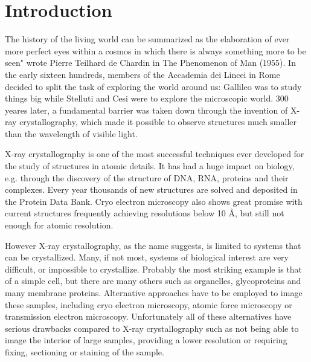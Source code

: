 \chapter{Introduction}\label{introduction}\noindent

The history of the living world can be summarized as the elaboration of ever
more perfect eyes within a cosmos in which there is always something more to be
seen" wrote Pierre Teilhard de Chardin in The Phenomenon of Man (1955). In the
early sixteen hundreds, members of the Accademia dei Lincei in Rome decided to
split the task of exploring the world around us: Gallileo was to study things
big while Stelluti and Cesi were to explore the microscopic world. 300 yeares
later, a fundamental barrier was taken down through the invention of X-ray
crystallography, which made it possible to observe structures much smaller than
the wavelength of visible light.

X-ray crystallography is one of the most successful techniques ever developed
for the study of structures in atomic details. It has had a huge impact on
biology, e.g. through the discovery of the structure of DNA, RNA, proteins
and their complexes. Every year thousands of new structures are solved and
deposited in the Protein Data Bank. Cryo electron microscopy also shows great
promise with current structures frequently achieving resolutions below 10 \AA,
but still not enough for atomic resolution. 



However X-ray crystallography, as the name suggests, is limited to systems that
can be crystallized. Many, if not most, systems of biological interest are very
difficult, or impossible to crystallize. Probably the most striking example is
that of a simple cell, but there are many others such as organelles, glycoproteins and many
membrane proteins. Alternative approaches have to be employed to image these
samples, including cryo electron microscopy, atomic force microscopy or
transmission electron microscopy. Unfortunately all of these alternatives have
serious drawbacks compared to X-ray crystallography such as not being able to
image the interior of large samples, providing a lower resolution or requiring
fixing, sectioning or staining of the sample.

